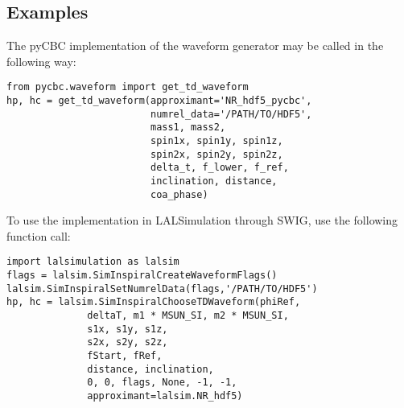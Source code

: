 \documentclass[a4paper, 11pt]{article}
\begin{document}
\subsection{Examples}
The pyCBC implementation of the waveform generator may be called in the following way: \\
\begin{lstlisting}
from pycbc.waveform import get_td_waveform 
hp, hc = get_td_waveform(approximant='NR_hdf5_pycbc', 
                         numrel_data='/PATH/TO/HDF5',
                         mass1, mass2,
                         spin1x, spin1y, spin1z,
                         spin2x, spin2y, spin2z, 
                         delta_t, f_lower, f_ref,
                         inclination, distance, 
                         coa_phase)
\end{lstlisting}
To use the implementation in LALSimulation through SWIG, use the following function call:\\
\begin{lstlisting}
import lalsimulation as lalsim
flags = lalsim.SimInspiralCreateWaveformFlags()
lalsim.SimInspiralSetNumrelData(flags,'/PATH/TO/HDF5')
hp, hc = lalsim.SimInspiralChooseTDWaveform(phiRef, 
              deltaT, m1 * MSUN_SI, m2 * MSUN_SI, 
              s1x, s1y, s1z,
              s2x, s2y, s2z, 
              fStart, fRef, 
              distance, inclination, 
              0, 0, flags, None, -1, -1, 
              approximant=lalsim.NR_hdf5)
\end{lstlisting}


\end{document}
